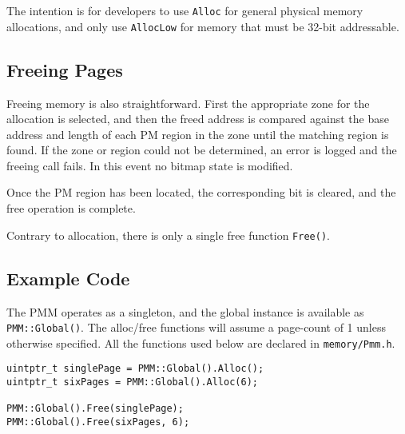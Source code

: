 The intention is for developers to use \verb|Alloc| for general physical memory allocations, and only use \verb|AllocLow| for memory that must be 32-bit addressable.

\subsection{Freeing Pages}
Freeing memory is also straightforward. First the appropriate zone for the allocation is selected, and then the freed address is compared against the base address and length of each PM region in the zone until the matching region is found. If the zone or region could not be determined, an error is logged and the freeing call fails. In this event no bitmap state is modified.

Once the PM region has been located, the corresponding bit is cleared, and the free operation is complete.

Contrary to allocation, there is only a single free function \verb|Free()|.

\subsection{Example Code}
The PMM operates as a singleton, and the global instance is available as \verb|PMM::Global()|. The alloc/free functions will assume a page-count of 1 unless otherwise specified. All the functions used below are declared in \verb|memory/Pmm.h|.

\begin{lstlisting}
uintptr_t singlePage = PMM::Global().Alloc();
uintptr_t sixPages = PMM::Global().Alloc(6);

PMM::Global().Free(singlePage);
PMM::Global().Free(sixPages, 6);
\end{lstlisting}
